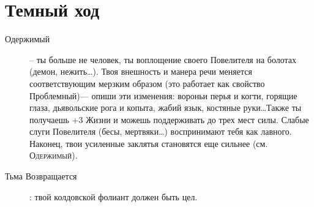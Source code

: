 \documentclass[10pt,twoside]{report}
\begin{document}
\section*{Темный ход}
\begin{description}
\item[Одержимый]-- ты больше не человек, ты воплощение своего
  Повелителя на болотах (демон, нежить\ldots). Твоя внешность и манера
  речи меняется соответствующим мерзким образом (это работает как
  свойство Проблемный)--- опиши эти изменения: вороньи перья и когти,
  горящие глаза, дьявольские рога и копыта, жабий язык, костяные
  руки\ldots Также ты получаешь +3 Жизни и можешь поддерживать до трех
  мест силы. Слабые слуги Повелителя (бесы, мертвяки\ldots)
  воспринимают тебя как лавного. Наконец, твои усиленные заклятья
  становятся еще сильнее (см. \textsc{Одержимый}).
  \item[Тьма Возвращается]: твой   колдовской фолиант должен быть цел.
\end{description}
\pagebreak
\end{document}
